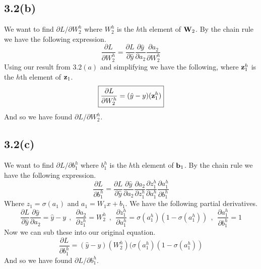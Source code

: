 \documentclass[submit]{harvardml}
\begin{document}
\subsection*{3.2(b)}
We want to find $\partial L / \partial W_2^h$ where $W_2^h$ is the $h$th element of $\vb{W}_2$. By the chain rule we have the following expression.
\begin{equation*}
    \frac{\partial L}{\partial W_2^h} = \frac{\partial L}{\partial \hat{y}} \frac{\partial \hat{y}}{\partial a_2} \frac{\partial a_2}{\partial W_2^h}
\end{equation*}
Using our result from $3.2(a)$ and simplifying we have the following, where $\vb{z}_1^h$ is the $h$th element of $\vb{z}_1$.
\begin{equation*}
    \boxed{\frac{\partial L}{\partial W_2^h} = (\hat{y} - y)(\vb{z}_1^h)}
\end{equation*}
And so we have found $\partial L / \partial W_2^h$.

\subsection*{3.2(c)}
We want to find $\partial L / \partial b_1^h$ where $b_1^h$ is the $h$th element of $\vb{b}_1$. By the chain rule we have the following expression.
\begin{equation*}
    \frac{\partial L}{\partial b_1^h} = \frac{\partial L}{\partial \hat{y}} \frac{\partial \hat{y}}{\partial a_2}  \frac{\partial a_2}{\partial z_1^h}  \frac{\partial z_1^h}{\partial a_1^h} \frac{\partial a_1^h}{\partial b_1^h}
\end{equation*}
Where $z_1 = \sigma(a_1)$ and $a_1 = W_1 x + b_1$. We have the following partial derivatives.
\begin{equation*}
    \frac{\partial L}{\partial \hat{y}} \frac{\partial \hat{y}}{\partial a_2} = \hat{y} - y \ \ , \ \ \frac{\partial a_2}{\partial z_1^h} = W_2^h \ \ , \ \  \frac{\partial z_1^h}{\partial a_1^h} = \sigma(a_1^h)(1 - \sigma(a_1^h)) \ \ , \ \ \frac{\partial a_1^h}{\partial b_1^h} = 1
\end{equation*}
Now we can sub these into our original equation.
\begin{equation*}
    \boxed{\frac{\partial L}{\partial b_1^h} = (\hat{y} - y)(W_2^h)(\sigma(a_1^h)(1 - \sigma(a_1^h))}
\end{equation*}
And so we have found $\partial L / \partial b_1^h$.
\end{document}
